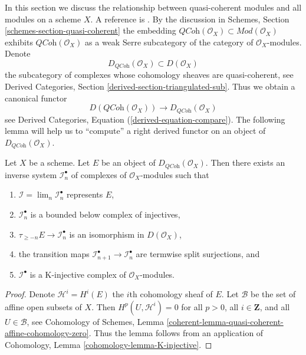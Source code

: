 \noindent
In this section we discuss the relationship between quasi-coherent
modules and all modules on a scheme $X$. A reference is
\cite[Appendix B]{TT}. By the discussion in
Schemes, Section \ref{schemes-section-quasi-coherent}
the embedding
$\textit{QCoh}(\mathcal{O}_X) \subset \textit{Mod}(\mathcal{O}_X)$
exhibits $\textit{QCoh}(\mathcal{O}_X)$ as a weak Serre subcategory of
the category of $\mathcal{O}_X$-modules. Denote
$$
D_{\textit{QCoh}}(\mathcal{O}_X) \subset D(\mathcal{O}_X)
$$
the subcategory of complexes whose cohomology sheaves are quasi-coherent, see
Derived Categories, Section \ref{derived-section-triangulated-sub}.
Thus we obtain a canonical functor
\begin{equation}
\label{equation-compare}
D(\textit{QCoh}(\mathcal{O}_X))
\longrightarrow
D_{\textit{QCoh}}(\mathcal{O}_X)
\end{equation}
see Derived Categories, Equation (\ref{derived-equation-compare}).
The following lemma will help us to ``compute'' a right derived functor
on an object of $D_{\textit{QCoh}}(\mathcal{O}_X)$.

\begin{lemma}
\label{lemma-nice-K-injective}
Let $X$ be a scheme. Let $E$ be an object of
$D_{\textit{QCoh}}(\mathcal{O}_X)$. Then there exists an inverse
system $\mathcal{I}_n^\bullet$ of complexes of $\mathcal{O}_X$-modules
such that
\begin{enumerate}
\item $\mathcal{I} = \lim_n \mathcal{I}_n^\bullet$ represents $E$,
\item $\mathcal{I}_n^\bullet$ is a bounded below complex of injectives,
\item $\tau_{\geq -n}E \to \mathcal{I}_n^\bullet$ is an isomorphism
in $D(\mathcal{O}_X)$,
\item the transition maps
$\mathcal{I}_{n + 1}^\bullet \to \mathcal{I}_n^\bullet$
are termwise split surjections, and
\item $\mathcal{I}^\bullet$ is a K-injective complex of
$\mathcal{O}_X$-modules.
\end{enumerate}
\end{lemma}

\begin{proof}
Denote $\mathcal{H}^i = H^i(E)$ the $i$th cohomology sheaf of $E$.
Let $\mathcal{B}$ be the set of affine open subsets of $X$. Then
$H^p(U, \mathcal{H}^i) = 0$ for all $p > 0$, all $i \in \mathbf{Z}$,
and all $U \in \mathcal{B}$, see
Cohomology of Schemes, Lemma
\ref{coherent-lemma-quasi-coherent-affine-cohomology-zero}.
Thus the lemma follows from an application of
Cohomology, Lemma \ref{cohomology-lemma-K-injective}.
\end{proof}

